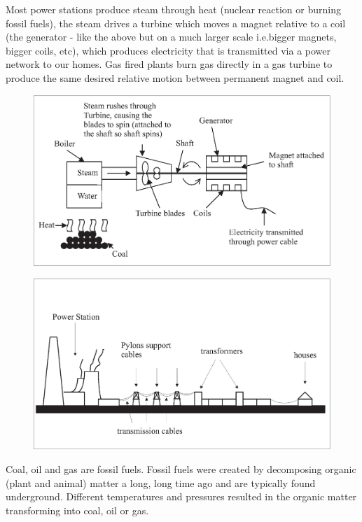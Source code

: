 Most power stations produce steam through heat (nuclear reaction or burning fossil fuels), the steam drives a turbine which moves a magnet relative to a coil (the generator - like the above but on a much larger scale i.e.\@ bigger magnets, bigger coils, etc), which produces electricity that is transmitted via a power network to our homes. Gas fired plants burn gas directly in a gas turbine to produce the same desired relative motion between permanent magnet and coil.

\begin{figure}[H]
\centering
\includegraphics[scale=0.4]{../../epsimages/2SteamPower.eps}
\end{figure}

\begin{figure}[H]
\centering
\includegraphics[scale=0.4]{../../epsimages/3PowerStation.eps}
\end{figure}

Coal, oil and gas are fossil fuels. Fossil fuels were created by
decomposing organic (plant and animal) matter a long, long time ago
and are typically found underground. Different temperatures and
pressures resulted in the organic matter transforming into coal, oil
or gas.

